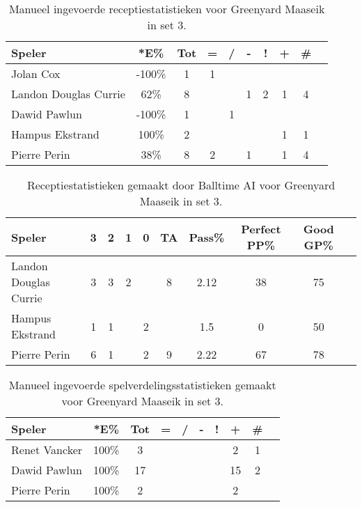 
\begin{table}[ht!]
    \centering
    \scriptsize
    \begin{tabular}{|l|c|c|c|c|c|c|c|c|c|} \hline
        \textbf{Speler} & *E\% & Tot & = & / & - & ! & + & \#\\ \hline
        Jolan Cox & -100\% & 1 & 1 &  &  &  &  & \\ 
        Landon Douglas Currie & 62\% & 8 &  &  & 1 & 2 & 1 & 4 \\ 
        Dawid Pawlun & -100\% & 1 &  & 1 &  &  &  &  \\ 
        Hampus Ekstrand & 100\% & 2 &  &  &  &  & 1 & 1 \\ 
        Pierre Perin & 38\% & 8 & 2 &  & 1 &  & 1 & 4 \\ \hline
    \end{tabular}
    \caption[Manueel ingevoerde receptiestatistieken voor Greenyard Maaseik in set 3]{\label{tab:PL3ReceiveMaaseikMan3}Manueel ingevoerde receptiestatistieken voor Greenyard Maaseik in set 3.}
\end{table}

\begin{table}[ht!]
  \centering
  \scriptsize
  \begin{tabular}{|l|c|c|c|c|c|c|c|c|c|} \hline
    \textbf{Speler} & 3 & 2 & 1 & 0 & TA & Pass\% & Perfect PP\% & Good GP\% \\ \hline
    Landon Douglas Currie & 3 & 3 & 2 &  & 8 & 2.12 & 38 & 75 \\
    Hampus Ekstrand & 1 & 1 &   & 2 & & 1.5 & 0 & 50 \\
    Pierre Perin & 6 & 1 &   & 2 & 9 & 2.22 & 67 & 78 \\ \hline
  \end{tabular}
  \caption[Receptiestatistieken gemaakt door Balltime AI voor Greenyard Maaseik in set 3]{\label{tab:PL3ReceiveMaaseikAI3}Receptiestatistieken gemaakt door Balltime AI voor Greenyard Maaseik in set 3.}
\end{table}


\begin{table}[ht!]
    \centering
    \scriptsize
    \begin{tabular}{|l|c|c|c|c|c|c|c|c|c|} \hline
        \textbf{Speler} & *E\% & Tot & = & / & - & ! & + & \#\\ \hline
        Renet Vancker & 100\% & 3 &  &  &  &  & 2 & 1 \\ 
        Dawid Pawlun & 100\% & 17 &  &  &  &  & 15 & 2 \\ 
        Pierre Perin & 100\% & 2 &  &  &  &  & 2 &  \\ \hline
    \end{tabular}
    \caption[Manueel ingevoerde spelverdelingsstatistieken gemaakt voor Greenyard Maaseik in set 3]{\label{tab:PL3SetMaaseikMan3}Manueel ingevoerde spelverdelingsstatistieken gemaakt voor Greenyard Maaseik in set 3.}
\end{table}

